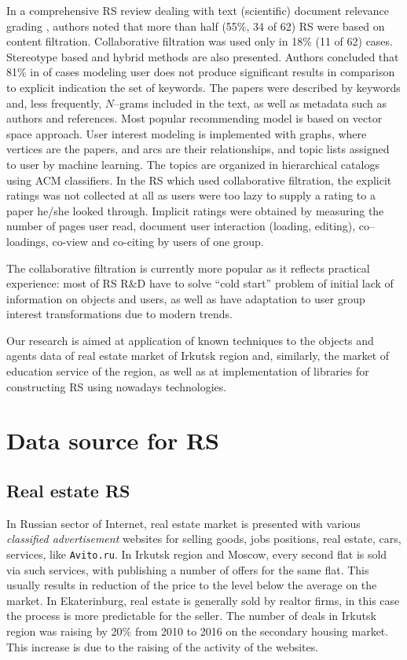 \documentclass[conference]{IEEEtran}
\begin{document}
In a comprehensive RS review dealing with text (scientific) document relevance grading \cite{br13}, authors noted that more than half (55\%, 34 of 62) RS were based on content filtration.  Collaborative filtration was used only in 18\% (11 of 62) cases.  Stereotype based and hybrid methods are also presented.  Authors concluded that 81\% in of cases modeling user does not produce significant results in comparison to explicit indication the set of keywords.  The papers were described by keywords and, less frequently, $N$--grams included in the text, as well as metadata such as authors and references.  Most popular recommending model is based on vector space approach.  User interest modeling is implemented with graphs, where vertices are the papers, and arcs are their relationships, and topic lists assigned to user by machine learning.  The topics are organized in hierarchical catalogs using ACM classifiers.  In the RS which used collaborative filtration, the explicit ratings was not collected at all as users were too lazy to supply a rating to a paper he/she looked through.  Implicit ratings were obtained by measuring the number of pages user read, document user interaction (loading, editing), co--loadings, co-view and co-citing by users of one group.

The collaborative filtration is currently more popular as it reflects practical experience: most of RS R\&D have to solve ``cold start'' problem of initial lack of information on objects and users, as well as have adaptation to user group interest transformations due to modern trends.


Our research is aimed at application of known techniques to the objects and agents data of real estate market of Irkutsk region and, similarly, the market of education service of the region, as well as at implementation of libraries for constructing RS using nowadays technologies.

\section{Data source for RS}

\subsection{Real estate RS}

In Russian sector of Internet, real estate market is presented with various \emph{classified advertisement} websites for selling goods, jobs positions, real estate, cars, services, like \texttt{Avito.ru}.  In Irkutsk region and Moscow, every second flat is sold via such services, with publishing a number of offers for the same flat.  This usually results in reduction of the price to the level below the average on the market.  In Ekaterinburg, real estate is generally sold by realtor firms, in this case the process is more predictable for the seller.  The number of deals in Irkutsk region was raising by 20\% from 2010 to 2016 on the secondary housing market.  This increase is due to the raising of the activity of the websites.
\end{document}
